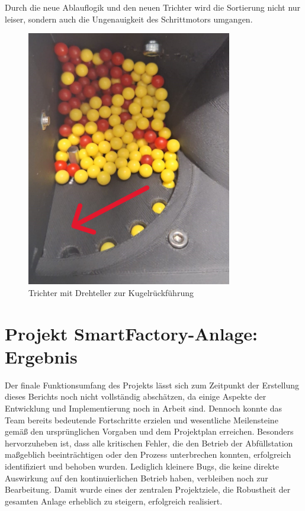 Durch die neue Ablauflogik und den neuen Trichter wird die Sortierung nicht nur leiser, sondern auch die Ungenauigkeit des Schrittmotors umgangen.  

\begin{figure}[h!] %
    \centering  
    \includegraphics[width=0.8\textwidth]{figures/b15ba5c8-ba29-495a-9e40-18a8cdfba58f.PNG}
    \caption{Trichter mit Drehteller zur Kugelrückführung\cite{siemens2022}} 
    \label{fig:Trichter mit Drehteller zur Kugelrückführung} %
    \vspace{0.5em} %
    \small %
\end{figure}

\section{Projekt SmartFactory-Anlage: Ergebnis}\label{sec:Projekt_SmartFactory-Anlage:_Ergebnis}

Der finale Funktionsumfang des Projekts lässt sich zum Zeitpunkt der Erstellung dieses Berichts noch nicht vollständig abschätzen, da einige 
Aspekte der Entwicklung und Implementierung noch in Arbeit sind. Dennoch konnte das Team bereits bedeutende Fortschritte erzielen und wesentliche 
Meilensteine gemäß den ursprünglichen Vorgaben und dem Projektplan erreichen. Besonders hervorzuheben ist, dass alle kritischen Fehler, die den 
Betrieb der Abfüllstation maßgeblich beeinträchtigen oder den Prozess unterbrechen konnten, erfolgreich identifiziert und behoben wurden. 
Lediglich kleinere Bugs, die keine direkte Auswirkung auf den kontinuierlichen Betrieb haben, verbleiben noch zur Bearbeitung. Damit wurde 
eines der zentralen Projektziele, die Robustheit der gesamten Anlage erheblich zu steigern, erfolgreich realisiert.

